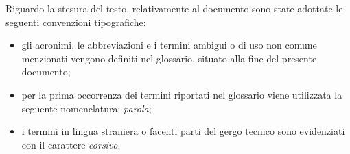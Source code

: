 Riguardo la stesura del testo, relativamente al documento sono state adottate le seguenti convenzioni tipografiche:
\begin{itemize}
	\item gli acronimi, le abbreviazioni e i termini ambigui o di uso non comune menzionati vengono definiti nel glossario, situato alla fine del presente documento;
	\item per la prima occorrenza dei termini riportati nel glossario viene utilizzata la seguente nomenclatura: \emph{parola}\glsfirstoccur;
	\item i termini in lingua straniera o facenti parti del gergo tecnico sono evidenziati con il carattere \emph{corsivo}.
\end{itemize}
